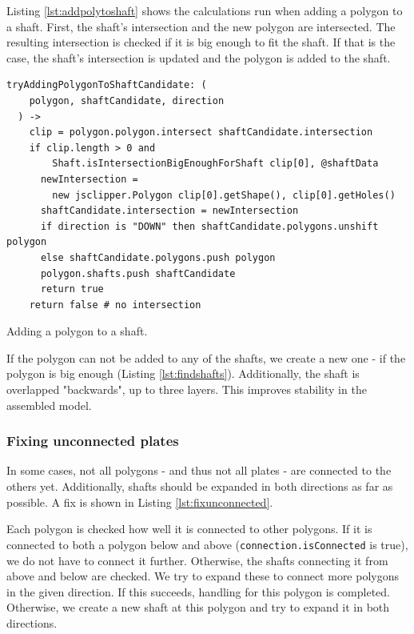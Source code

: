 \documentclass[../ClassicThesis.tex]{subfiles}
\begin{document}
Listing \ref{lst:addpolytoshaft} shows the calculations run when adding a polygon to a shaft. First, the shaft's intersection and the new polygon are intersected. The resulting intersection is checked if it is big enough to fit the shaft. If that is the case, the shaft's intersection is updated and the polygon is added to the shaft.

\begin{listing}[ht]
\begin{verbatim}
tryAddingPolygonToShaftCandidate: (
    polygon, shaftCandidate, direction
  ) ->
    clip = polygon.polygon.intersect shaftCandidate.intersection
    if clip.length > 0 and
        Shaft.isIntersectionBigEnoughForShaft clip[0], @shaftData
      newIntersection =
        new jsclipper.Polygon clip[0].getShape(), clip[0].getHoles()
      shaftCandidate.intersection = newIntersection
      if direction is "DOWN" then shaftCandidate.polygons.unshift polygon
      else shaftCandidate.polygons.push polygon
      polygon.shafts.push shaftCandidate
      return true
    return false # no intersection
\end{verbatim}
\caption{Adding a polygon to a shaft.}
\label{lst:addpolytoshaft}
\end{listing}

If the polygon can not be added to any of the shafts, we create a new one - if the polygon is big enough (Listing \ref{lst:findshafts}). Additionally, the shaft is overlapped "backwards", up to three layers. This improves stability in the assembled model.

\subsubsection{Fixing unconnected plates}

In some cases, not all polygons - and thus not all plates - are connected to the others yet. Additionally, shafts should be expanded in both directions as far as possible. A fix is shown in Listing \ref{lst:fixunconnected}.

Each polygon is checked how well it is connected to other polygons. If it is connected to both a polygon below and above (\texttt{connection.isConnected} is true), we do not have to connect it further. Otherwise, the shafts connecting it from above and below are checked. We try to expand these to connect more polygons in the given direction. If this succeeds, handling for this polygon is completed. Otherwise, we create a new shaft at this polygon and try to expand it in both directions.
\end{document}
